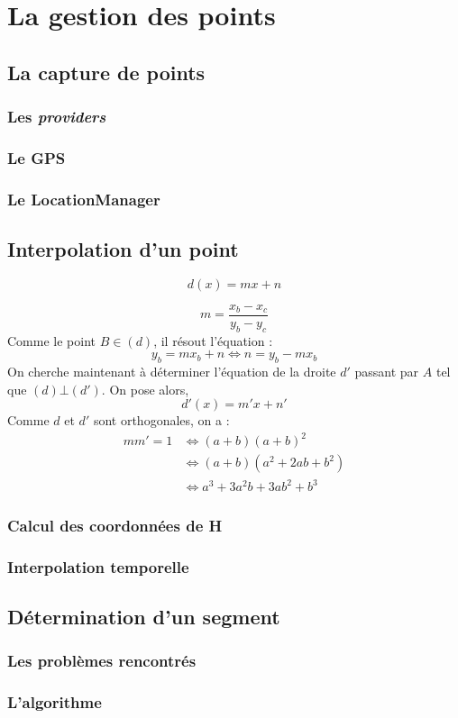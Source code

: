 \chapter{La gestion des points}

\section{La capture de points}
\subsection{Les \textit{providers}}
\subsection{Le GPS}
\subsection{Le LocationManager}

\section{Interpolation d'un point}
\[
 d(x) = mx + n
\]

\[
   m =  \frac{x_b-x_c}{y_b-y_c}
\]
Comme le point $B \in (d)$, il résout l'équation :
\[
   y_b = mx_b + n 
   \Leftrightarrow n = y_b - mx_b
\]
On cherche maintenant à déterminer l'équation de la droite $ d' $ passant par $ A $ tel que $ (d)\bot (d') $. On pose alors, 
 \[
 d'(x) = m'x + n'
\]
Comme $d$ et $d'$ sont orthogonales, on a :
\begin{align}
	mm' = 1 &\Leftrightarrow (a+b)(a+b)^2 \\
        	&\Leftrightarrow (a+b)(a^2+2ab+b^2) \\
        	&\Leftrightarrow a^3+3a^2b+3ab^2+b^3
\end{align}

\subsection{Calcul des coordonnées de H}

\subsection{Interpolation temporelle}

\section{Détermination d'un segment}
\subsection{Les problèmes rencontrés}
\subsection{L'algorithme}